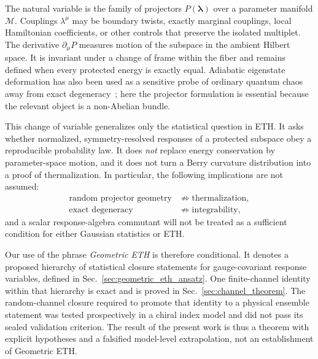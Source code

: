 The natural variable is the family of projectors
$P(\boldsymbol\lambda)$ over a parameter manifold $\mathcal M$.  Couplings
$\lambda^\mu$ may be boundary twists, exactly marginal couplings, local
Hamiltonian coefficients, or other controls that preserve the isolated
multiplet.  The derivative $\partial_\mu P$ measures motion of the subspace in
the ambient Hilbert space.  It is invariant under a change of frame within
the fiber and remains defined when every protected energy is exactly equal.
Adiabatic eigenstate deformation has also been used as a sensitive probe of
ordinary quantum chaos away from exact degeneracy~\cite{pandey2020}; here the
projector formulation is essential because the relevant object is a
non-Abelian bundle.

This change of variable generalizes only the statistical question in ETH.
It asks whether normalized, symmetry-resolved responses of a protected
subspace obey a reproducible probability law.  It does \emph{not} replace
energy conservation by parameter-space motion, and it does not turn a Berry
curvature distribution into a proof of thermalization.  In particular, the
following implications are not assumed:
\begin{align}
 \text{random projector geometry}
 &\not\Rightarrow \text{thermalization},\nonumber\\
 \text{exact degeneracy}
 &\not\Rightarrow \text{integrability},
 \label{eq:no_eth_implication}
\end{align}
and a scalar response-algebra commutant will not be treated as a sufficient
condition for either Gaussian statistics or ETH.

Our use of the phrase \emph{Geometric ETH} is therefore conditional.  It
denotes a proposed hierarchy of statistical closure statements for
gauge-covariant response variables, defined in
Sec.~\ref{sec:geometric_eth_ansatz}.  One finite-channel identity within that
hierarchy is exact and is proved in Sec.~\ref{sec:channel_theorem}.  The
random-channel closure required to promote that identity to a physical
ensemble statement was tested prospectively in a chiral index model and did
not pass its sealed validation criterion.  The result of the present work is
thus a theorem with explicit hypotheses and a falsified model-level
extrapolation, not an establishment of Geometric ETH.
